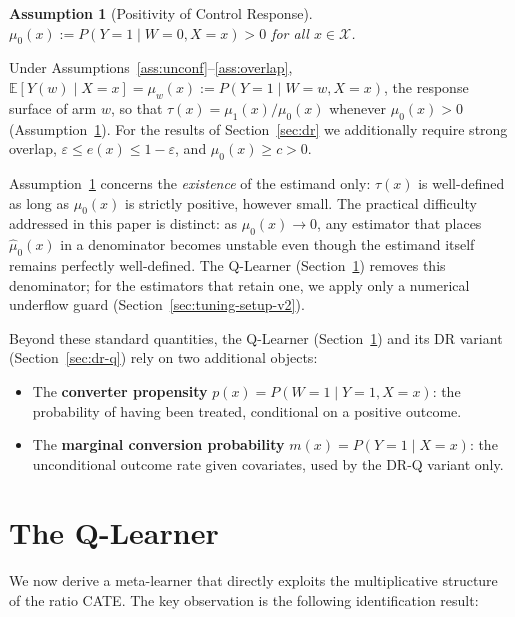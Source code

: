 \documentclass{article}
\newtheorem{assumption}{Assumption}
\begin{document}
\begin{assumption}[Positivity of Control Response]
\label{ass:positivity}
$\mu_0(x) := P(Y{=}1 \mid W{=}0, X{=}x) > 0$ for all $x \in \mathcal{X}$.
\end{assumption}

Under Assumptions~\ref{ass:unconf}--\ref{ass:overlap},
$\mathbb{E}[Y(w)\mid X{=}x]=\mu_w(x):=P(Y{=}1\mid W{=}w,X{=}x)$, the
response surface of arm $w$, so that $\tau(x)=\mu_1(x)/\mu_0(x)$ whenever
$\mu_0(x)>0$ (Assumption~\ref{ass:positivity}). For the results of
Section~\ref{sec:dr} we additionally require strong overlap,
$\varepsilon\le e(x)\le 1-\varepsilon$, and $\mu_0(x)\ge c>0$.

Assumption~\ref{ass:positivity} concerns the \emph{existence} of the estimand only:
$\tau(x)$ is well-defined as long as $\mu_0(x)$ is strictly positive,
however small. The practical difficulty addressed in this paper is
distinct: as $\mu_0(x) \to 0$, any estimator that places
$\hat{\mu}_0(x)$ in a denominator becomes unstable even though the
estimand itself remains perfectly well-defined. The Q-Learner
(Section~\ref{sec:q-learner}) removes this denominator; for the
estimators that retain one, we apply only a numerical underflow guard
(Section~\ref{sec:tuning-setup-v2}).

Beyond these standard quantities, the Q-Learner
(Section~\ref{sec:q-learner}) and its DR variant
(Section~\ref{sec:dr-q}) rely on two additional objects:
\begin{itemize}
    \item The \textbf{converter propensity}
    $p(x) = P(W{=}1 \mid Y{=}1, X{=}x)$: the probability of having been
    treated, conditional on a positive outcome.
    \item The \textbf{marginal conversion probability}
    $m(x) = P(Y{=}1 \mid X{=}x)$: the unconditional outcome rate given
    covariates, used by the DR-Q variant only.
\end{itemize}

\section{The Q-Learner}
\label{sec:q-learner}

We now derive a meta-learner that directly exploits the multiplicative
structure of the ratio CATE. The key observation is the following
identification result:
\end{document}
